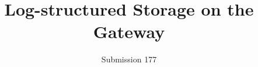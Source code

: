 \documentclass[letterpaper,twocolumn,10pt]{article}
\begin{document}
\date{}

\title{\Large \bf
	Log-structured Storage on the Gateway\\}

\author{Submission 177}

\maketitle













\end{document}
